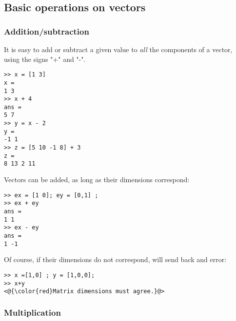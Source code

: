\subsection{Basic operations on vectors}
\subsubsection{Addition/subtraction}
It is easy to add or subtract a given value to \emph{all} the components of a vector, using the signs "+" and "-".

\begin{lstlisting}
>> x = [1 3]
x = 
1 3
>> x + 4
ans =
5 7
>> y = x - 2
y =
-1 1
>> z = [5 10 -1 8] + 3
z = 
8 13 2 11
\end{lstlisting}


Vectors can be added, as long as their dimensions correspond:

\begin{lstlisting}
>> ex = [1 0]; ey = [0,1] ;
>> ex + ey
ans =
1 1
>> ex - ey
ans =
1 -1
\end{lstlisting}

Of course, if their dimensions do not correspond, \matlab will send back and error:

\begin{lstlisting}
>> x =[1,0] ; y = [1,0,0];
>> x+y
<@{\color{red}Matrix dimensions must agree.}@>
\end{lstlisting}







\subsubsection{Multiplication}
